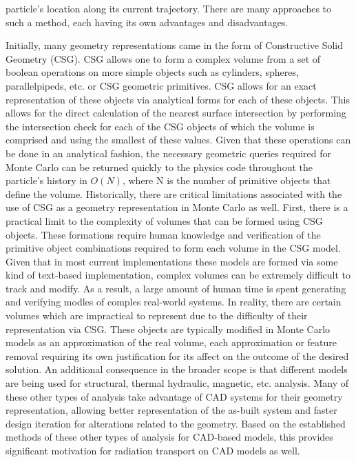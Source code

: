 \documentclass[12pt, a4paper]{article}
\begin{document}
particle's location along its current trajectory. There are many approaches to such a method, each having its own advantages and disadvantages.

Initially, many geometry representations came in the form of Constructive Solid Geometry (CSG). CSG allows one to form a complex volume from a set of boolean operations on more simple objects such as cylinders, spheres, parallelpipeds, etc. or CSG geometric primitives. CSG allows for an exact representation of these objects via analytical forms for each of these objects. This allows for the direct calculation of the nearest surface intersection by performing the intersection check for each of the CSG objects of which the volume is comprised and using the smallest of these values. Given that these operations can be done in an analytical fashion, the necessary geometric queries required for Monte Carlo can be returned quickly to the physics code throughout the particle's history in $O(N)$, where N is the number of primitive objects that define the volume. Historically, there are critical limitations associated with the use of CSG as a geometry representation in Monte Carlo as well. First, there is a practical limit to the complexity of volumes that can be formed using CSG objects. These formations require human knowledge and verification of the primitive object combinations required to form each volume in the CSG model. Given that in most current implementations these models are formed via some kind of text-based implementation, complex volumes can be extremely difficult to track and modify. As a result, a large amount of human time is spent generating and verifying modles of comples real-world systems. In reality, there are certain volumes which are impractical to represent due to the difficulty of their representation via CSG. These objects are typically modified in Monte Carlo models as an approximation of the real volume, each approximation or feature removal requiring its own justification for its affect on the outcome of the desired solution. An additional consequence in the broader scope is that different models are being used for structural, thermal hydraulic, magnetic, etc. analysis. Many of these other types of analysis take advantage of CAD systems for their geometry representation, allowing better representation of the as-built system and faster design iteration for alterations related to the geometry. Based on the established methods of these other types of analysis for CAD-based models, this provides significant motivation for radiation transport on CAD models as well.
\end{document}
